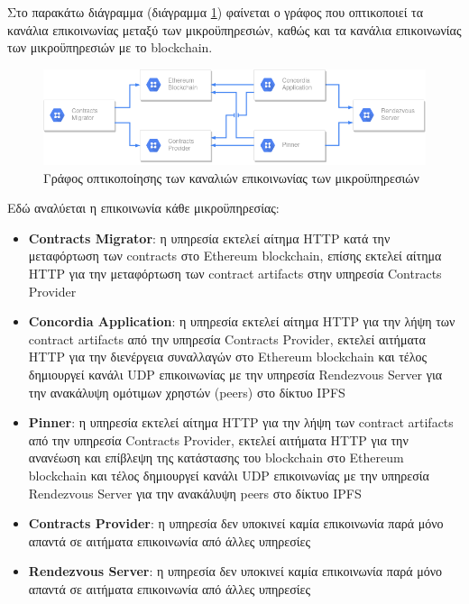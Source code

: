 Στο παρακάτω διάγραμμα (διάγραμμα \ref{figure:4-4-communications-graph}) φαίνεται ο γράφος που οπτικοποιεί τα κανάλια επικοινωνίας μεταξύ των μικροϋπηρεσιών, καθώς και τα κανάλια επικοινωνίας των μικροϋπηρεσιών με το blockchain.

\begin{figure}[H]
    \centering
    \includegraphics[width=15cm]{assets/figures/chapter-4/4.4.communications-diagram.png}
    \caption{Γράφος οπτικοποίησης των καναλιών επικοινωνίας των μικροϋπηρεσιών}
    \label{figure:4-4-communications-graph}
\end{figure}

Εδώ αναλύεται η επικοινωνία κάθε μικροϋπηρεσίας:

\begin{itemize}
    \item \textbf{Contracts Migrator}: η υπηρεσία εκτελεί αίτημα HTTP κατά την μεταφόρτωση των contracts στο Ethereum blockchain, επίσης εκτελεί αίτημα HTTP για την μεταφόρτωση των contract artifacts στην υπηρεσία Contracts Provider

    \item \textbf{Concordia Application}: η υπηρεσία εκτελεί αίτημα HTTP για την λήψη των contract artifacts από την υπηρεσία Contracts Provider, εκτελεί αιτήματα HTTP για την διενέργεια συναλλαγών στο Ethereum blockchain και τέλος δημιουργεί κανάλι UDP επικοινωνίας με την υπηρεσία Rendezvous Server για την ανακάλυψη ομότιμων χρηστών (peers) στο δίκτυο IPFS

    \item \textbf{Pinner}: η υπηρεσία εκτελεί αίτημα HTTP για την λήψη των contract artifacts από την υπηρεσία Contracts Provider, εκτελεί αιτήματα HTTP για την ανανέωση και επίβλεψη της κατάστασης του blockchain στο Ethereum blockchain και τέλος δημιουργεί κανάλι UDP επικοινωνίας με την υπηρεσία Rendezvous Server για την ανακάλυψη peers στο δίκτυο IPFS

    \item \textbf{Contracts Provider}: η υπηρεσία δεν υποκινεί καμία επικοινωνία παρά μόνο απαντά σε αιτήματα επικοινωνία από άλλες υπηρεσίες

    \item \textbf{Rendezvous Server}: η υπηρεσία δεν υποκινεί καμία επικοινωνία παρά μόνο απαντά σε αιτήματα επικοινωνία από άλλες υπηρεσίες
\end{itemize}

